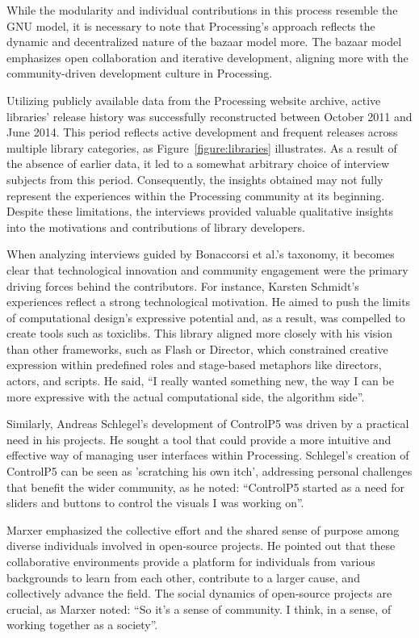 While the modularity and individual contributions in this process resemble the GNU model, it is necessary to note that Processing’s approach reflects the dynamic and decentralized nature of the bazaar model more. The bazaar model emphasizes open collaboration and iterative development, aligning more with the community-driven development culture in Processing.

Utilizing publicly available data from the Processing website archive, active libraries’ release history was successfully reconstructed between October 2011 and June 2014. This period reflects active development and frequent releases across multiple library categories, as Figure~\ref*{figure:libraries} illustrates. As a result of the absence of earlier data, it led to a somewhat arbitrary choice of interview subjects from this period. Consequently, the insights obtained may not fully represent the experiences within the Processing community at its beginning. Despite these limitations, the interviews provided valuable qualitative insights into the motivations and contributions of library developers. 



When analyzing interviews guided by Bonaccorsi et al.’s taxonomy, it becomes clear that technological innovation and community engagement were the primary driving forces behind the contributors. For instance, Karsten Schmidt’s experiences reflect a strong technological motivation. He aimed to push the limits of computational design’s expressive potential and, as a result, was compelled to create tools such as toxiclibs. This library aligned more closely with his vision than other frameworks, such as Flash or Director, which constrained creative expression within predefined roles and stage-based metaphors like directors, actors, and scripts. He said, \enquote{I really wanted something new, the way I can be more expressive with the actual computational side, the algorithm side}.

Similarly, Andreas Schlegel’s development of ControlP5 was driven by a practical need in his projects. He sought a tool that could provide a more intuitive and effective way of managing user interfaces within Processing. Schlegel’s creation of ControlP5 can be seen as ’scratching his own itch’, addressing personal challenges that benefit the wider community, as he noted: \enquote{ControlP5 started as a need for sliders and buttons to control the visuals I was working on}.

Marxer emphasized the collective effort and the shared sense of purpose among diverse individuals involved in open-source projects. He pointed out that these collaborative environments provide a platform for individuals from various backgrounds to learn from each other, contribute to a larger cause, and collectively advance the field. The social dynamics of open-source projects are crucial, as Marxer noted: \enquote{So it’s a sense of community. I think, in a sense, of working together as a society}.

